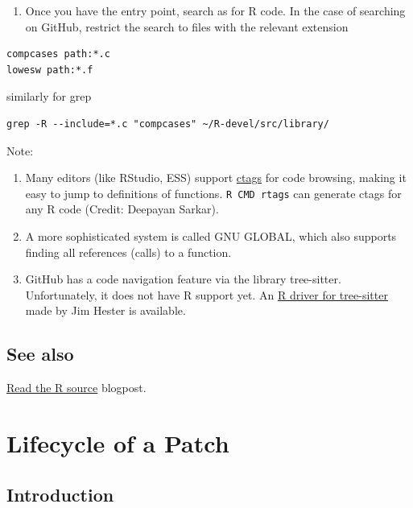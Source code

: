 \documentclass[
]{book}
\providecommand{\tightlist}{%
  \setlength{\itemsep}{0pt}\setlength{\parskip}{0pt}}
\begin{document}
\begin{enumerate}
\def\labelenumi{\arabic{enumi}.}
\setcounter{enumi}{1}
\tightlist
\item
  Once you have the entry point, search as for R code. In the case of searching on GitHub, restrict the search to files with the relevant extension
\end{enumerate}

\begin{verbatim}
compcases path:*.c
lowesw path:*.f
\end{verbatim}

similarly for grep

\begin{verbatim}
grep -R --include=*.c "compcases" ~/R-devel/src/library/
\end{verbatim}

Note:

\begin{enumerate}
\def\labelenumi{\arabic{enumi}.}
\item
  Many editors (like RStudio, ESS) support \href{https://en.wikipedia.org/wiki/Ctags}{ctags} for code browsing, making it easy to jump to definitions of functions. \texttt{R\ CMD\ rtags} can generate ctags for any R code (Credit: Deepayan Sarkar).
\item
  A more sophisticated system is called GNU GLOBAL, which also supports
  finding all references (calls) to a function.
\item
  GitHub has a code navigation feature via the library tree-sitter. Unfortunately, it does not have R support yet. An \href{https://github.com/r-lib/tree-sitter-r}{R driver for tree-sitter} made by Jim Hester is available.
\end{enumerate}

\section{See also}\label{see-also-3}

\href{https://blog.r-hub.io/2019/05/14/read-the-source/}{Read the R source} blogpost.

\chapter{Lifecycle of a Patch}\label{FixBug}

\section{Introduction}\label{introduction-1}
\end{document}
